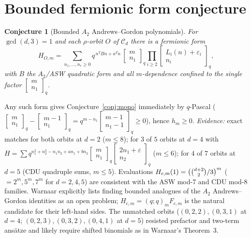 \documentclass[11pt]{article}
\newtheorem{conjecture}[theorem]{Conjecture}
\newcommand{\qbin}[2]{\begin{bmatrix}#1\\#2\end{bmatrix}_q}
\begin{document}
\section{Bounded fermionic form conjecture}

\begin{conjecture}[Bounded $A_2$ Andrews--Gordon polynomials]\label{conj:ferm}
For $\gcd(d,3)=1$ and each $\rho$-orbit $O$ of $\mathcal{C}_d$ there is a fermionic form
\[
H_{O,m}=\sum_{n_1,\dots,n_r\ge0} q^{\,n^TBn+a^Tn}\,\qbin{m}{n_1}
\prod_{i\ge2}\qbin{L_i(n)+\varepsilon_i}{n_i},
\]
with $B$ the $A_2$/ASW quadratic form and all $m$-dependence confined to the single factor
$\qbin{m}{n_1}$.
\end{conjecture}

Any such form gives Conjecture~\ref{conj:mono} immediately by $q$-Pascal
($\qbin{m}{n_1}-\qbin{m-1}{n_1}=q^{m-n_1}\qbin{m-1}{n_1-1}\ge0$), hence $h_m\ge0$.
\emph{Evidence:} exact matches for both orbits at $d=2$ ($m\le8$); for $3$ of $5$ orbits at
$d=4$ with $H=\sum q^{n_1^2+n_2^2-n_1n_2+an_1+bn_2}\qbin{m}{n_1}\qbin{2n_1+\varepsilon}{n_2}$
($m\le6$); for $4$ of $7$ orbits at $d=5$ (CDU quadruple sums, $m\le5$). Evaluations
$H_{c,m}(1)=\bigl(\tbinom{d+2}{2}/3\bigr)^m$ ($=2^m,5^m,7^m$ for $d=2,4,5$) are consistent
with the ASW mod-7 and CDU mod-8 families. Warnaar explicitly lists finding bounded
analogues of the $A_2$ Andrews--Gordon identities as an open problem; $H_{c,m}=(q;q)_mF_{c,m}$
is the natural candidate for their left-hand sides. The unmatched orbits
($(0,2,2),(0,3,1)$ at $d=4$; $(0,2,3),(0,3,2),(0,4,1)$ at $d=5$) resisted prefactor and
two-term ans\"atze and likely require shifted binomials as in Warnaar's Theorem~3.
\end{document}
